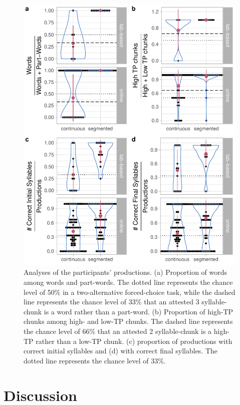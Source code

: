 \documentclass[]{article}
\begin{document}
\begin{figure}

{\centering \includegraphics[width=0.8\linewidth]{segmentation_recall_combined_files/figure-latex/recall-w-pw-chunks-positions-plot-1}

}

\caption{Analyses of the participants' productions. (a) Proportion of words among words and part-words. The dotted line represents the chance level of 50\% in a two-alternative forced-choice task, while the dashed line represents the chance level of 33\% that an attested 3 syllable-chunk is a word rather than a part-word. (b) Proportion of high-TP chunks among high- and low-TP chunks. The dashed line represents the chance level of 66\% that an attested 2 syllable-chunk is a high-TP rather than a low-TP chunk. (c) proportion of productions with correct initial syllables and (d) with correct final syllables. The dotted line represents the chance level of 33\%.}\label{fig:recall-w-pw-chunks-positions-plot}
\end{figure}

\clearpage

\section{Discussion}\label{discussion}
\end{document}
